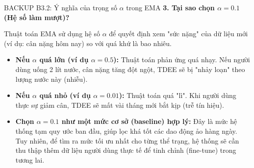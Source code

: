 \documentclass[10pt, aspectratio=169]{beamer}
\begin{document}
\begin{frame}[label=b3_2]{BACKUP B3.2: Ý nghĩa của trọng số $\alpha$ trong EMA}
\hypertarget{b3_2_target}{}
    \textbf{3. Tại sao chọn $\alpha = 0.1$ (Hệ số làm mượt)?}
    \vspace{0.2cm}
    
    Thuật toán EMA sử dụng hệ số $\alpha$ để quyết định xem "sức nặng" của dữ liệu mới (ví dụ: cân nặng hôm nay) so với quá khứ là bao nhiêu.
    \vspace{0.2cm}
    
    \begin{itemize}
        \item \textbf{Nếu $\alpha$ quá lớn (ví dụ $\alpha = 0.5$):} Thuật toán phản ứng quá nhạy. Nếu người dùng uống 2 lít nước, cân nặng tăng đột ngột, TDEE sẽ bị "nhảy loạn" theo lượng nước này (nhiễu).
        \vspace{0.2cm}
        \item \textbf{Nếu $\alpha$ quá nhỏ (ví dụ $\alpha = 0.01$):} Thuật toán quá "lì". Khi người dùng thực sự giảm cân, TDEE sẽ mất vài tháng mới bắt kịp (trễ tín hiệu).
        \vspace{0.2cm}
        \item \textcolor{NutriGreen!80!black}{\textbf{Chọn $\alpha = 0.1$ như một mức cơ sở (baseline) hợp lý:}} Đây là mức hệ thống tạm quy ước ban đầu, giúp lọc khá tốt các dao động ảo hàng ngày. Tuy nhiên, để tìm ra mức tối ưu nhất cho từng thể trạng, hệ thống sẽ cần thu thập thêm dữ liệu người dùng thực tế để tinh chỉnh (fine-tune) trong tương lai.
    \end{itemize}
\end{frame}
\end{document}
